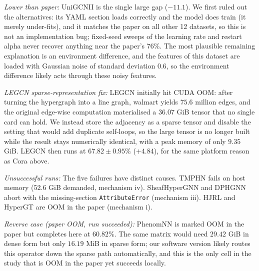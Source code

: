 \documentclass[11pt,a4paper]{article}
\begin{document}
\noindent\textit{Lower than paper:} UniGCNII is the single large gap ($-11.1$). We first ruled out the alternatives: its YAML section loads correctly and the model does train (it merely under-fits), and it matches the paper on all other 12 datasets, so this is not an implementation bug; fixed-seed sweeps of the learning rate and restart alpha never recover anything near the paper's $76\%$. The most plausible remaining explanation is an environment difference, and the features of this dataset are loaded with Gaussian noise of standard deviation $0.6$, so the environment difference likely acts through these noisy features.

\noindent\textit{LEGCN sparse-representation fix:} LEGCN initially hit CUDA OOM: after turning the hypergraph into a line graph, walmart yields $75.6$ million edges, and the original edge-wise computation materialised a $36.07$ GiB tensor that no single card can hold. We instead store the adjacency as a sparse tensor and disable the setting that would add duplicate self-loops, so the large tensor is no longer built while the result stays numerically identical, with a peak memory of only $9.35$ GiB. LEGCN then runs at $67.82\pm0.95\%$ ($+4.84$), for the same platform reason as Cora above.

\noindent\textit{Unsuccessful runs:} The five failures have distinct causes. TMPHN fails on host memory (52.6 GiB demanded, mechanism iv). SheafHyperGNN and DPHGNN abort with the missing-section \texttt{AttributeError} (mechanism iii). HJRL and HyperGT are OOM in the paper (mechanism i).

\noindent\textit{Reverse case (paper OOM, run succeeded):} PhenomNN is marked OOM in the paper but completes here at $60.82\%$. The same matrix would need $29.42$ GiB in dense form but only $16.19$ MiB in sparse form; our software version likely routes this operator down the sparse path automatically, and this is the only cell in the study that is OOM in the paper yet succeeds locally.
\end{document}
